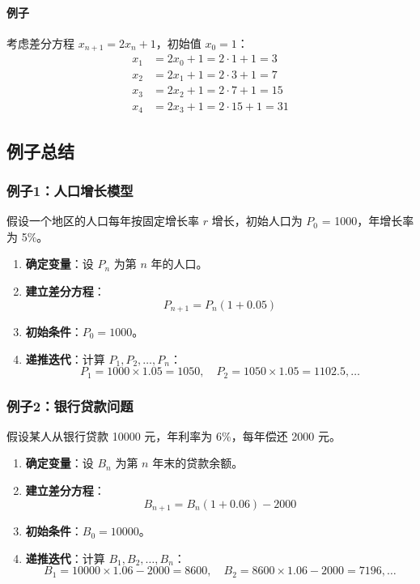 \documentclass[UTF8]{ctexart}
\begin{document}
\paragraph{例子}
考虑差分方程 \(x_{n+1} = 2x_n + 1\)，初始值 \(x_0 = 1\)：
\[
\begin{aligned}
x_1 & = 2x_0 + 1 = 2 \cdot 1 + 1 = 3 \\
x_2 & = 2x_1 + 1 = 2 \cdot 3 + 1 = 7 \\
x_3 & = 2x_2 + 1 = 2 \cdot 7 + 1 = 15 \\
x_4 & = 2x_3 + 1 = 2 \cdot 15 + 1 = 31
\end{aligned}
\]


\subsection {例子总结}
\subsubsection {例子1：人口增长模型}
假设一个地区的人口每年按固定增长率 \( r \) 增长，初始人口为 \( P_0 \) = 1000，年增长率为 5\%。
\begin{enumerate}
    \item \textbf{确定变量}：设 \( P_n \) 为第 \( n \) 年的人口。
    \item \textbf{建立差分方程}：
    \[
    P_{n+1} = P_n (1 + 0.05)
    \]
    \item \textbf{初始条件}：\( P_0 = 1000 \)。
    \item \textbf{递推迭代}：计算 \( P_1, P_2, \ldots, P_n \)：
    \[
    P_1 = 1000 \times 1.05 = 1050, \quad P_2 = 1050 \times 1.05 = 1102.5, \ldots
    \]
\end{enumerate}

\subsubsection {例子2：银行贷款问题}
假设某人从银行贷款 10000 元，年利率为 6\%，每年偿还 2000 元。
\begin{enumerate}
    \item \textbf{确定变量}：设 \( B_n \) 为第 \( n \) 年末的贷款余额。
    \item \textbf{建立差分方程}：
    \[
    B_{n+1} = B_n (1 + 0.06) - 2000
    \]
    \item \textbf{初始条件}：\( B_0 = 10000 \)。
    \item \textbf{递推迭代}：计算 \( B_1, B_2, \ldots, B_n \)：
    \[
    B_1 = 10000 \times 1.06 - 2000 = 8600, \quad B_2 = 8600 \times 1.06 - 2000 = 7196, \ldots
    \]
\end{enumerate}
\end{document}

